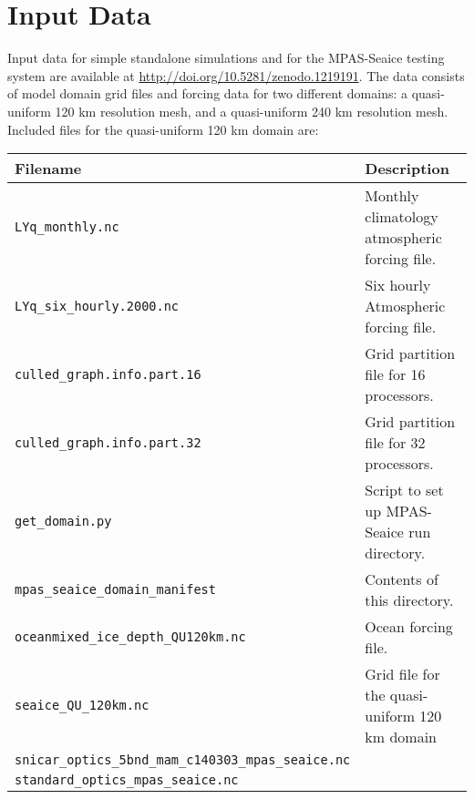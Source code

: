 \section{Input Data}
\label{sec:input_data}

Input data for simple standalone simulations and for the MPAS-Seaice testing system are available at \url{http://doi.org/10.5281/zenodo.1219191}. The data consists of model domain grid files and forcing data for two different domains: a quasi-uniform 120 km resolution mesh, and a quasi-uniform 240 km resolution mesh. Included files for the quasi-uniform 120 km domain are:

\begin{table}[H]
\begin{tabular}{ll}
\hline
Filename & Description \\
\hline
\lstinline+LYq_monthly.nc+ & Monthly climatology atmospheric forcing file. \\
\lstinline+LYq_six_hourly.2000.nc+ & Six hourly Atmospheric forcing file. \\
\lstinline+culled_graph.info.part.16+ & Grid partition file for 16 processors. \\
\lstinline+culled_graph.info.part.32+ & Grid partition file for 32 processors. \\
\lstinline+get_domain.py+ & Script to set up MPAS-Seaice run directory. \\
\lstinline+mpas_seaice_domain_manifest+ & Contents of this directory. \\
\lstinline+oceanmixed_ice_depth_QU120km.nc+ & Ocean forcing file. \\
\lstinline+seaice_QU_120km.nc+ & Grid file for the quasi-uniform 120 km domain \\
\lstinline+snicar_optics_5bnd_mam_c140303_mpas_seaice.nc+ &  \\
\lstinline+standard_optics_mpas_seaice.nc+ &  \\
\hline
\end{tabular}
\end{table}